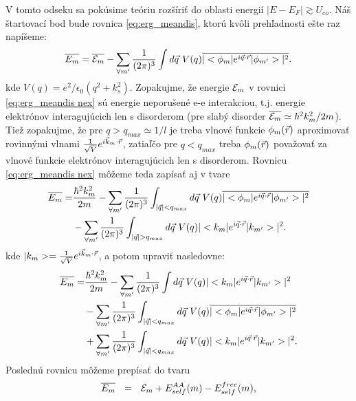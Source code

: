 V tomto odseku sa pokúsime teóriu rozšíriť do oblasti energií $|E-E_F| \gtrsim U_{co}$. Náš štartovací bod bude rovnica \eqref{eq:erg_meandis}, ktorú kvôli prehľadnosti ešte raz napíšeme:
\begin{equation}
\label{eq:erg_meandis nex}
 \overline{E_m}=\overline{\mathcal{E}_m}-\sum_{\forall m'} \frac{1}{(2\pi)^{3}} \int d\vec{q}\ V(q) \overline{|<\phi_m|e^{i\vec{q}\cdot\vec{r}}|\phi_{m'}>|^2} \text{.}
\end{equation}
kde $V(q) = e^2/\epsilon_0(q^2+k_s^2)$.
Zopakujme, že energie $\mathcal{E}_m$ v  rovnici \eqref{eq:erg_meandis nex} sú energie neporušené e-e interakciou, t.j. energie elektrónov interagujúcich len s disorderom (pre slabý disorder $\overline{\mathcal{E}_m} \simeq \hbar^2 k_m^2/2m$). Tiež zopakujme, že
pre $q > q_{max} \simeq 1/l$ je treba vlnové funkcie $\phi_m(\vec{r})$ aproximovať rovinnými vlnami $\frac{1}{\sqrt V}e^{i\vec{k}_m\cdot\vec{r}}$, zatiaľčo pre $q < q_{max}$ treba
$\phi_m(\vec{r})$ považovať za vlnové funkcie elektrónov interagujúcich len s disorderom. Rovnicu \eqref{eq:erg_meandis nex} môžeme teda zapísať aj v tvare
\begin{equation}\label{eq:erg_meandis nex nex}
\begin{split}
 \overline{E_m}= &\frac{\hbar^2 k_m^2}{2m} - \sum_{\forall m'} \frac{1}{(2\pi)^{3}} \int_{|\vec{q}| < q_{max}} d\vec{q}\ V(q) \overline{|<\phi_m|e^{i\vec{q}\cdot\vec{r}}|\phi_{m'}>|^2}  \\
    &  - \sum_{\forall m'} \frac{1}{(2\pi)^{3}} \int_{|\vec{q}| > q_{max}} d\vec{q}\ V(q) |<k_m|e^{i\vec{q}\cdot\vec{r}}|k_{m'}>|^2 \text{.}
\end{split}
\end{equation}
kde $|k_{m}>= \frac{1}{\sqrt V}e^{i\vec{k}_m\cdot\vec{r}}$, a potom upraviť nasledovne:
\begin{equation}\label{eq:erg_meandis nex prepis}
\begin{split}
 \overline{E_m}= &\frac{\hbar^2 k_m^2}{2m} - \sum_{\forall m'} \frac{1}{(2\pi)^{3}} \int d\vec{q}\ V(q) |<k_m|e^{i\vec{q}\cdot\vec{r}}|k_{m'}>|^2  \\
    & -\sum_{\forall m'} \frac{1}{(2\pi)^{3}} \int_{|\vec{q}| < q_{max}} d\vec{q}\ V(q) \overline{|<\phi_m|e^{i\vec{q}\cdot\vec{r}}|\phi_{m'}>|^2} \\
    & + \sum_{\forall m'} \frac{1}{(2\pi)^{3}} \int_{|\vec{q}| < q_{max}} d\vec{q}\ V(q) |<k_m|e^{i\vec{q}\cdot\vec{r}}|k_{m'}>|^2\text{.}
\end{split}
\end{equation}
Poslednú rovnicu môžeme prepísať do tvaru
\begin{equation}\label{eq:erg_meandis nex prepis skratka}
 \overline{E_m} \ \ = \ \ \mathcal{E}_m + E_{self}^{AA}(m) - E_{self}^{free}(m)  \text{,}
\end{equation}
